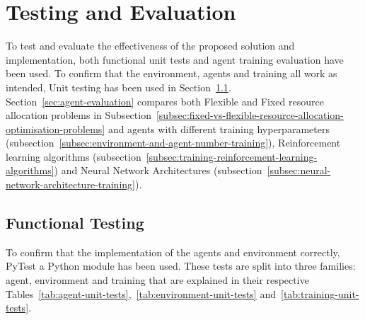 
\chapter{Testing and Evaluation}
\label{ch:testing-and-evaluation}
To test and evaluate the effectiveness of the proposed solution and implementation, both functional unit tests and
agent training evaluation have been used. To confirm that the environment, agents and training all work as intended,
Unit testing has been used in Section~\ref{sec:functional-testing}.\\
Section~\ref{sec:agent-evaluation} compares both Flexible and Fixed resource allocation problems in
Subsection~\ref{subsec:fixed-vs-flexible-resource-allocation-optimisation-problems} and agents with
different training hyperparameters (subsection~\ref{subsec:environment-and-agent-number-training}), Reinforcement
learning algorithms (subsection~\ref{subsec:training-reinforcement-learning-algorithms}) and Neural Network
Architectures (subsection~\ref{subsec:neural-network-architecture-training}).

\section{Functional Testing}
\label{sec:functional-testing}
To confirm that the implementation of the agents and environment correctly, PyTest a Python module has been used. These
tests are split into three families: agent, environment and training that are
explained in their respective Tables~\ref{tab:agent-unit-tests},~\ref{tab:environment-unit-tests}
and~\ref{tab:training-unit-tests}.

